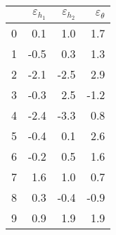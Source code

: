 \begin{tabular}{lrrr}
\toprule
{} & $\varepsilon_{h_1}$ & $\varepsilon_{h_2}$ & $\varepsilon_\theta$ \\
\midrule
0 &  0.1 &  1.0 &    1.7 \\
1 & -0.5 &  0.3 &    1.3 \\
2 & -2.1 & -2.5 & \alert{2.9} \\
3 & -0.3 &  2.5 &   -1.2 \\
4 & -2.4 & -3.3 & \alert{0.8} \\
5 & -0.4 &  0.1 &    2.6 \\
6 & -0.2 &  0.5 &    1.6 \\
7 &  1.6 &  1.0 &    0.7 \\
8 &  0.3 & -0.4 &   -0.9 \\
9 &  0.9 &  1.9 &    1.9 \\
\bottomrule
\end{tabular}
